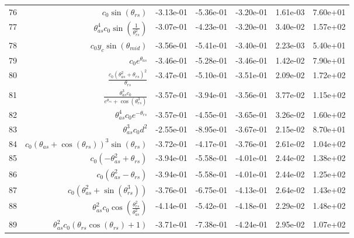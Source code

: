 \begin{tabularx}{\textwidth}{lRRRRRl}
76  &  $ c_{0} \sin{\left(\theta_{rs} \right)} $  &  -3.13e-01  &  -5.36e-01  &  -3.20e-01  &  1.61e-03  &  7.60e+01  \\ 
77  &  $ \theta_{as}^{4} c_{0} \sin{\left(\displaystyle\frac{1}{\theta_{rs}^{2}} \right)} $  &  -3.07e-01  &  -4.23e-01  &  -3.20e-01  &  3.40e-02  &  1.57e+02  \\ 
78  &  $ c_{0} y_c \sin{\left(\theta_{mid} \right)} $  &  -3.56e-01  &  -5.41e-01  &  -3.40e-01  &  2.23e-03  &  5.40e+01  \\ 
79  &  $ c_{0} e^{\theta_{as}} $  &  -3.46e-01  &  -5.28e-01  &  -3.46e-01  &  1.42e-02  &  7.90e+01  \\ 
80  &  $ \displaystyle\frac{c_{0} \left(\theta_{as}^{2} + \theta_{rs}\right)^{2}}{\theta_{rs}} $  &  -3.47e-01  &  -5.10e-01  &  -3.51e-01  &  2.09e-02  &  1.72e+02  \\ 
81  &  $ \displaystyle\frac{\theta_{as}^{3} c_{0}}{e^{\theta_{rs}} + \cos{\left(\theta_{rs}^{3} \right)}} $  &  -3.57e-01  &  -3.94e-01  &  -3.56e-01  &  3.77e-02  &  1.15e+02  \\ 
82  &  $ \theta_{as}^{4} c_{0} e^{- \theta_{rs}} $  &  -3.57e-01  &  -4.55e-01  &  -3.65e-01  &  3.26e-02  &  1.60e+02  \\ 
83  &  $ \theta_{as}^{3} c_{0} d^{2} $  &  -2.55e-01  &  -8.95e-01  &  -3.67e-01  &  2.15e-02  &  8.70e+01  \\ 
84  &  $ c_{0} \left(\theta_{as} + \cos{\left(\theta_{rs} \right)}\right)^{3} \sin{\left(\theta_{rs} \right)} $  &  -3.72e-01  &  -4.17e-01  &  -3.76e-01  &  2.61e-02  &  1.04e+02  \\ 
85  &  $ c_{0} \left(- \theta_{as}^{2} + \theta_{rs}\right) $  &  -3.94e-01  &  -5.58e-01  &  -4.01e-01  &  2.44e-02  &  1.38e+02  \\ 
86  &  $ c_{0} \left(\theta_{as}^{2} - \theta_{rs}\right) $  &  -3.94e-01  &  -5.58e-01  &  -4.01e-01  &  2.44e-02  &  1.25e+02  \\ 
87  &  $ c_{0} \left(\theta_{as}^{2} + \sin{\left(\theta_{rs}^{3} \right)}\right) $  &  -3.76e-01  &  -6.75e-01  &  -4.13e-01  &  2.64e-02  &  1.43e+02  \\ 
88  &  $ \theta_{as}^{2} c_{0} \cos{\left(\displaystyle\frac{\theta_{rs}^{2}}{\theta_{as}^{2}} \right)} $  &  -4.14e-01  &  -5.42e-01  &  -4.18e-01  &  2.29e-02  &  1.48e+02  \\ 
89  &  $ \theta_{as}^{2} c_{0} \left(\theta_{rs} \cos{\left(\theta_{rs} \right)} + 1\right) $  &  -3.71e-01  &  -7.38e-01  &  -4.24e-01  &  2.95e-02  &  1.07e+02  \\ 

\end{tabularx}
